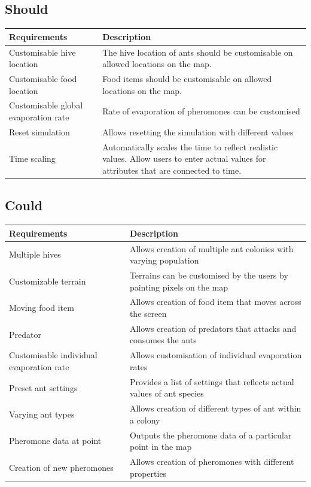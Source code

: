 \documentclass[a4paper, oneside, 11pt]{report}
\begin{document}
\subsection{Should}
\begin{tabular}{||p{3.5cm} | p{10.5cm} ||} 
	\hline
	Requirements & Description \\
	\hline
	Customisable hive location & The hive location of ants should be customisable on allowed locations on the map. \\
	\hline
	Customisable food location & Food items should be customisable on allowed locations on the map. \\
	\hline
	Customisable global evaporation rate & Rate of evaporation of pheromones can be customised\\
	\hline
	Reset simulation & Allows resetting the simulation with different values \\
	\hline
	Time scaling & Automatically scales the time to reflect realistic values. Allow users to enter actual values for attributes that are connected to time.\\
	\hline
\end{tabular}

\subsection{Could}
\begin{tabular}{|| p{3.5cm} | p{10.5cm} ||} 
	\hline
	Requirements & Description \\
	\hline
	Multiple hives & Allows creation of multiple ant colonies with varying population \\
	\hline
	Customizable terrain & Terrains can be customised by the users by painting pixels on the map \\
	\hline
	Moving food item & Allows creation of food item that moves across the screen \\
	\hline
	Predator & Allows creation of predators that attacks and consumes the ants\\
	\hline
	Customisable individual evaporation rate & Allows customisation of individual evaporation rates \\
	\hline
	Preset ant settings & Provides a list of settings that reflects actual values of ant species \\
	\hline
	Varying ant types & Allows creation of different types of ant within a colony \\
	\hline
	Pheromone data at point & Outputs the pheromone data of a particular point in the map\\
	\hline
	Creation of new pheromones & Allows creation of pheromones with different properties\\
	\hline
\end{tabular}
\end{document}
